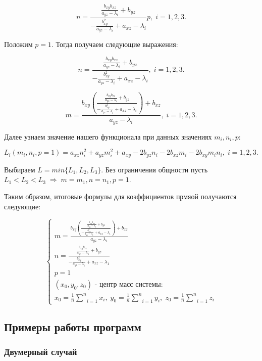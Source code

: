 $$n = \frac{\frac{b_{xy} b_{xz}}{a_{yz} - \lambda_i} + b_{yz}}{- \frac{b_{xy}^2}{a_{yz} - \lambda_i} + a_{xz} - \lambda_i} p, \; i=1,2,3.$$

Положим $p = 1$. Тогда получаем следующие выражения:

$$n = \frac{\frac{b_{xy} b_{xz}}{a_{yz} - \lambda_i} + b_{yz}}{- \frac{b_{xy}^2}{a_{yz} - \lambda_i} + a_{xz} - \lambda_i}, \; i =1,2,3.$$

$$m = \frac{b_{xy} \left(\frac{\frac{b_{xy} b_{xz}}{a_{yz} - \lambda_i} + b_{yz}}{- \frac{b_{xy}^2}{a_{yz} - \lambda_i} + a_{xz} - \lambda_i}\right) + b_{xz}}{a_{yz} - \lambda_i}, \; i = 1,2,3.$$

Далее узнаем значение нашего функционала при данных значениях $m_i, n_i, p$:

\begin{center}
	$L_i (m_i, n_i, p = 1)= a_{xz} n_i^2 + a_{yz} m_i^2 + a_{xy} - 2 b_{yz} n_i - 2 b_{xz} m_i  - 2 b_{xy} m_i n_i, \;i=1,2,3.$
\end{center}

Выбираем $L = min \{L_1, L_2, L_3\}$. Без ограничения общности пусть $L_1 < L_2 < L_3 \; \Rightarrow \; m = m_1, n = n_1, p = 1$.

Таким образом, итоговые формулы для коэффициентов прмяой получаются следующие:

$$\begin{cases}
	m = \frac{b_{xy} \left(\frac{\frac{b_{xy} b_{xz}}{a_{yz} - \lambda_1} + b_{yz}}{- \frac{b_{xy}^2}{a_{yz} - \lambda_1} + a_{xz} - \lambda_1}\right) + b_{xz}}{a_{yz} - \lambda_1} \\
	n = \frac{\frac{b_{xy} b_{xz}}{a_{yz} - \lambda_1} + b_{yz}}{- \frac{b_{xy}^2}{a_{yz} - \lambda_1} + a_{xz} - \lambda_1} \\
	p = 1 \\
	(x_0, y_0, z_0)\text{ - центр масс системы:} \\
	x_0 = \frac{1}{n}\underset{i=1}{\overset{n}{\sum}} x_i, \; y_0 = \frac{1}{n}\underset{i=1}{\overset{n}{\sum}} y_i, \; z_0 = \frac{1}{n}\underset{i=1}{\overset{n}{\sum}} z_i
\end{cases}$$

\newpage
\subsection{Примеры работы программ}\label{line:application}

\subsubsection{Двумерный случай}\label{line:application:2dim}

